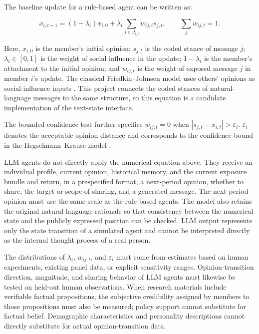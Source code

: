 \documentclass[11pt,a4paper]{article}
\begin{document}
The baseline update for a rule-based agent can be written as:

\begin{equation*}
x_{i,t+1}
=
(1-\lambda_i)x_{i,0}
+
\lambda_i
\sum_{j\in J_{i,t}}
w_{ij,t}s_{j,t},
\qquad
\sum_jw_{ij,t}=1.
\end{equation*}

Here, $x_{i,0}$ is the member's initial opinion; $s_{j,t}$ is the coded stance of message $j$; $\lambda_i\in[0,1]$ is the weight of social influence in the update; $1-\lambda_i$ is the member's attachment to the initial opinion; and $w_{ij,t}$ is the weight of exposed message $j$ in member $i$'s update. The classical Friedkin--Johnsen model uses others' opinions as social-influence inputs \cite{friedkin1990}. This project connects the coded stances of natural-language messages to the same structure, so this equation is a candidate implementation of the text-state interface.

The bounded-confidence test further specifies $w_{ij,t}=0$ when $|s_{j,t}-x_{i,t}|>\varepsilon_i$. $\varepsilon_i$ denotes the acceptable opinion distance and corresponds to the confidence bound in the Hegselmann--Krause model \cite{hegselmann2002}.

LLM agents do not directly apply the numerical equation above. They receive an individual profile, current opinion, historical memory, and the current exposure bundle and return, in a prespecified format, a next-period opinion, whether to share, the target or scope of sharing, and a generated message. The next-period opinion must use the same scale as the rule-based agents. The model also retains the original natural-language rationale so that consistency between the numerical state and the publicly expressed position can be checked. LLM output represents only the state transition of a simulated agent and cannot be interpreted directly as the internal thought process of a real person.

The distributions of $\lambda_i$, $w_{ij,t}$, and $\varepsilon_i$ must come from estimates based on human experiments, existing panel data, or explicit sensitivity ranges. Opinion-transition direction, magnitude, and sharing behavior of LLM agents must likewise be tested on held-out human observations. When research materials include verifiable factual propositions, the subjective credibility assigned by members to those propositions must also be measured; policy support cannot substitute for factual belief. Demographic characteristics and personality descriptions cannot directly substitute for actual opinion-transition data.
\end{document}
